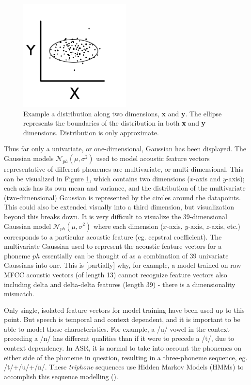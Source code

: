 \begin{figure}
\includegraphics[width=0.5\textwidth]{figure/two-dim-gauss.png}
\caption{Example a distribution along two dimensions, \textbf{x} and \textbf{y}.  The ellipse represents the boundaries of the distribution in both \textbf{x} and \textbf{y} dimensions. Distribution is only approximate.}\label{fig:two-dim-gauss}
\end{figure}
Thus far only a univariate, or one-dimensional, Gaussian has been displayed.  The Gaussian models $\mathcal{N}_{ph}(\mu,\sigma^2)$ used to model acoustic feature vectors representative of different phonemes are multivariate, or multi-dimensional.  This can be visualized in Figure \ref{fig:two-dim-gauss}, which contains two dimensions ($x$-axis and $y$-axis); each axis has its own mean and variance, and the distribution of the multivariate (two-dimensional) Gaussian is represented by the circles around the datapoints.  This could also be extended visually into a third dimension, but visualization beyond this breaks down.  It is very difficult to visualize the 39-dimensional Gaussian model $\mathcal{N}_{ph}(\mu,\sigma^2)$ where each dimension ($x$-axis, $y$-axis, $z$-axis, etc.) corresponds to a particular acoustic feature (eg. cepstral coefficient).  The multivariate Gaussian used to represent the acoustic feature vectors for a phoneme $ph$ essentially can be thought of as a combination of 39 univariate Gaussians into one.
This is [partially] why, for example, a model trained on raw MFCC acoustic vectors (of length 13) cannot recognize feature vectors also including delta and delta-delta features (length 39) - there is a dimensionality mismatch.

Only single, isolated feature vectors for model training have been used up to this point.  But speech is temporal and context dependent, and it is important to be able to model those characteristics.  For example, a /u/ vowel in the context preceding a /n/ has different qualities than if it were to precede a /t/, due to context dependency.  In ASR, it is normal to take into account the phonemes on either side of the phoneme in question, resulting in a three-phoneme sequence, eg. /t/+/u/+/n/.  These \textit{triphone} sequences use Hidden Markov Models (HMMs) to accomplish this sequence modelling (\cite{jurafsky:09}).


